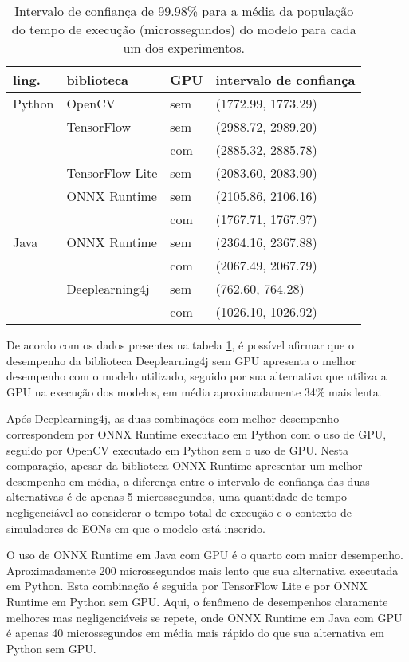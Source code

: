 \begin{table}
  \centering
  \begin{tabular}{llll}
    \toprule
    ling.  & biblioteca      & GPU & intervalo de confiança \\
    \midrule
    Python & OpenCV          & sem & (1772.99, 1773.29)     \\
           & TensorFlow      & sem & (2988.72, 2989.20)     \\
           &                 & com & (2885.32, 2885.78)     \\
           & TensorFlow Lite & sem & (2083.60, 2083.90)     \\
           & ONNX Runtime    & sem & (2105.86, 2106.16)     \\
           &                 & com & (1767.71, 1767.97)     \\
    Java   & ONNX Runtime    & sem & (2364.16, 2367.88)     \\
           &                 & com & (2067.49, 2067.79)     \\
           & Deeplearning4j  & sem & (762.60, 764.28)       \\
           &                 & com & (1026.10, 1026.92)     \\

    \bottomrule
  \end{tabular}
  \caption{Intervalo de confiança de 99.98\% para a média da população do tempo de execução (microssegundos) do modelo para cada um dos experimentos.}
  \label{tab:ci}
\end{table}

De acordo com os dados presentes na tabela \ref{tab:ci}, é possível afirmar que o desempenho da biblioteca Deeplearning4j sem GPU apresenta o melhor desempenho com o modelo utilizado, seguido por sua alternativa que utiliza a GPU na execução dos modelos, em média aproximadamente 34\% mais lenta.

Após Deeplearning4j, as duas combinações com melhor desempenho correspondem por ONNX Runtime executado em Python com o uso de GPU, seguido por OpenCV executado em Python sem o uso de GPU. Nesta comparação, apesar da biblioteca ONNX Runtime apresentar um melhor desempenho em média, a diferença entre o intervalo de confiança das duas alternativas é de apenas 5 microssegundos, uma quantidade de tempo negligenciável ao considerar o tempo total de execução e o contexto de simuladores de EONs em que o modelo está inserido.

O uso de ONNX Runtime em Java com GPU é o quarto com maior desempenho. Aproximadamente 200 microssegundos mais lento que sua alternativa executada em Python. Esta combinação é seguida por TensorFlow Lite e por ONNX Runtime em Python sem GPU. Aqui, o fenômeno de desempenhos claramente melhores mas negligenciáveis se repete, onde ONNX Runtime em Java com GPU é apenas 40 microssegundos em média mais rápido do que sua alternativa em Python sem GPU.

